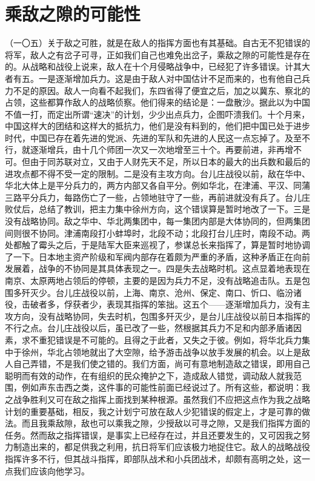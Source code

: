\section{乘敌之隙的可能性}

（一〇五）关于敌之可胜，就是在敌人的指挥方面也有其基础。自古无不犯错误的将军，敌人之有岔子可寻，正如我们自己也难免出岔子，乘敌之隙的可能性是存在的。从战略和战役上说来，敌人在十个月侵略战争中，已经犯了许多错误。计其大者有五。一是逐渐增加兵力。这是由于敌人对中国估计不足而来的，也有他自己兵力不足的原因。敌人一向看不起我们，东四省得了便宜之后，加之以冀东、察北的占领，这些都算作敌人的战略侦察。他们得来的结论是：一盘散沙。据此以为中国不值一打，而定出所谓“速决”的计划，少少出点兵力，企图吓溃我们。十个月来，中国这样大的团结和这样大的抵抗力，他们是没有料到的，他们把中国已处于进步时代，中国已存在着先进的党派、先进的军队和先进的人民这一点忘掉了。及至不行，就逐渐增兵，由十几个师团一次又一次地增至三十个。再要前进，非再增不可。但由于同苏联对立，又由于人财先天不足，所以日本的最大的出兵数和最后的进攻点都不得不受一定的限制。二是没有主攻方向。台儿庄战役以前，敌在华中、华北大体上是平分兵力的，两方内部又各自平分。例如华北，在津浦、平汉、同蒲三路平分兵力，每路伤亡了一些，占领地驻守了一些，再前进就没有兵了。台儿庄败仗后，总结了教训，把主力集中徐州方向，这个错误算是暂时地改了一下。三是没有战略协同。敌之华中、华北两集团中，每一集团内部是大体协同的，但两集团间则很不协同。津浦南段打小蚌埠时，北段不动；北段打台儿庄时，南段不动。两处都触了霉头之后，于是陆军大臣来巡视了，参谋总长来指挥了，算是暂时地协调了一下。日本地主资产阶级和军阀内部存在着颇为严重的矛盾，这种矛盾正在向前发展着，战争的不协同是其具体表现之一。四是失去战略时机。这点显着地表现在南京、太原两地占领后的停顿，主要的是因为兵力不足，没有战略追击队。五是包围多歼灭少。台儿庄战役以前，上海、南京、沧州、保定、南口、忻口、临汾诸役，击破者多，俘获者少，表现其指挥的笨拙。这五个——逐渐增加兵力，没有主攻方向，没有战略协同，失去时机，包围多歼灭少，是台儿庄战役以前日本指挥的不行之点。台儿庄战役以后，虽已改了一些，然根据其兵力不足和内部矛盾诸因素，求不重犯错误是不可能的。且得之于此者，又失之于彼。例如，将华北兵力集中于徐州，华北占领地就出了大空隙，给予游击战争以放手发展的机会。以上是敌人自己弄错，不是我们使之错的。我们方面，尚可有意地制造敌之错误，即用自己聪明而有效的动作，在有组织的民众掩护之下，造成敌人错觉，调动敌人就我范围，例如声东击西之类，这件事的可能性前面已经说过了。所有这些，都说明：我之战争胜利又可在敌之指挥上面找到某种根源。虽然我们不应把这点作为我之战略计划的重要基础，相反，我之计划宁可放在敌人少犯错误的假定上，才是可靠的做法。而且我乘敌隙，敌也可以乘我之隙，少授敌以可寻之隙，又是我们指挥方面的任务。然而敌之指挥错误，是事实上已经存在过，并且还要发生的，又可因我之努力制造出来的，都足供我之利用，抗日将军们应该极力地捉住它。敌人的战略战役指挥许多不行，但其战斗指挥，即部队战术和小兵团战术，却颇有高明之处，这一点我们应该向他学习。

